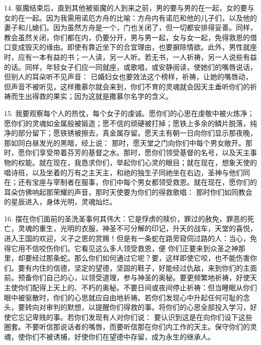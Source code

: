 14. 驱魔结束后，直到其他被驱魔的人到来之前，男的要与男的在一起，女的要与女的在一起。因为我需用诺厄方舟的比喻：方舟内有诺厄和他的儿子们，以及他的妻子和儿媳们。因为虽然方舟是一个，门也关闭了，但一切都安排得妥善。同样，教会虽然关闭，你们都在内，仍要分开，男与男一起，女与女一起，免得救恩的借口变成毁灭的缘由。即使有靠近坐下的合宜理由，也要摒除情欲。此外，男性就座时，应有一本有益的书；一人读，另一人听。若无书，一人祈祷，另一人说些有益的话。同样，年轻女子们应一同就座，或歌唱，或安静阅读，使她们的嘴唇说话，但别人的耳朵听不见声音： 已婚妇女也要效法这个榜样，祈祷，让她的嘴唇动，但声音不被听见，这样撒慕尔就会来到，你们不育的灵魂就会因天主垂听你们的祈祷而生出得救的果实；因为这就是撒慕尔名字的含义。\par

15. 我要观察每个人的热忱，每个女子的虔诚。愿你们的心思在虔敬中被火炼净；愿你们的灵魂如金属般被锻造；愿不信的顽硬被打掉；愿铁上多余的鳞片脱落，纯净的部分留下；愿铁锈被擦去，真金属存留。愿天主有朝一日向你们显示那夜晚，那如同白昼发光的黑暗，经上说： 那时，愿天堂之门向你们中每个男女敞开。那时，愿你们享受带着芬芳的基督之水。那时，愿你们领受基督的名号，以及天主事物的权能。就在现在，我恳求你们，举起你们心灵的眼目；就在现在，想象天使的唱诗班，以及坐着的万有之主天主，和祂的独生子同祂坐在右边，圣神与他们同在；还有宝座与宰制者在服事，你们中每个男女都领受救恩。就在现在，愿你们的耳朵仿佛响起那荣耀的声音，那时天使要为你们的得救歌唱： 那时你们如同教会的星辰进入，身体光明，灵魂灿烂。\par

16. 摆在你们面前的圣洗圣事何其伟大：它是俘虏的赎价，罪过的赦免，罪恶的死亡，灵魂的重生，光明的衣服，神圣不可分解的印记，升天的战车，天堂的喜悦，进入王国的欢迎，义子之恩的赏赐！但是有一条蛇在路旁窥伺过路的人：当心，免得它用不信咬伤你们。它看见这么多人领受救恩，便 你们正要来到众圣之神那里，却要经过那条蛇。那么你们如何通过它呢？要，这样即使它咬，也不能伤害你们。要有内住的信德，坚定的望德，坚固的鞋子，好能经过仇敌，来到你们的主面前。预备你们自己的心，以领受道理，参与神圣的奥秘。要更频繁地祈祷，好使天主使你们配得上天上的、不朽的奥秘。不要日间或夜间停止祈祷：但当睡眠从你们眼中被驱散时，你们的心思就应自由地祈祷。若你们发现心中升起任何可耻的念头，要转向对审判的默想，以提醒你们得救的事。将你们的心思全部投入学习，好使它忘记卑贱的事。若你们发现有人对你们说： 要认识到这是在向你们设下这些圈套。不要听信那说话者的嘴唇，而要听信那在你们内工作的天主。保守你们的灵魂，使你们不被诱捕，好使你们在望德中存留，成为永生的继承人。\par

